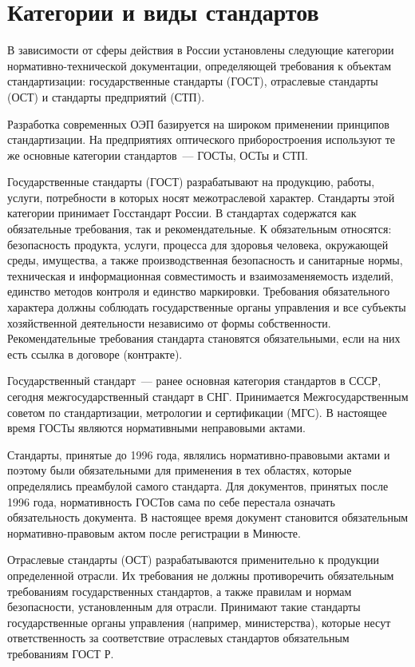 \section{Категории и виды стандартов}

В зависимости от сферы действия в России установлены следующие категории нормативно-технической документации, определяющей требования к объектам стандартизации: государственные стандарты (ГОСТ), отраслевые стандарты (ОСТ) и стандарты предприятий (СТП).

Разработка современных ОЭП базируется на широком применении принципов стандартизации. На предприятиях оптического приборостроения используют те же основные категории стандартов~--- ГОСТы, ОСТы и СТП.

Государственные стандарты (ГОСТ) разрабатывают на продукцию, работы, услуги, потребности в которых носят межотраслевой характер. Стандарты этой категории принимает Госстандарт России. В стандартах содержатся как обязательные требования, так и рекомендательные. К  обязательным относятся: безопасность продукта, услуги, процесса для здоровья человека, окружающей среды, имущества, а также производственная безопасность и санитарные нормы, техническая и информационная совместимость и взаимозаменяемость изделий, единство методов контроля и единство маркировки. Требования обязательного характера должны соблюдать государственные органы управления и все субъекты хозяйственной деятельности независимо от формы собственности. Рекомендательные требования стандарта становятся обязательными, если на них есть ссылка в договоре (контракте).

Государственный стандарт~--- ранее основная категория стандартов в СССР, сегодня межгосударственный стандарт в СНГ. Принимается Межгосударственным советом по стандартизации, метрологии и сертификации (МГС). В настоящее время ГОСТы являются нормативными неправовыми актами.

Стандарты, принятые до 1996 года, являлись нормативно-правовыми актами и поэтому были обязательными для применения в тех областях, которые определялись преамбулой самого стандарта. Для документов, принятых после 1996 года, нормативность ГОСТов сама по себе перестала означать обязательность документа. В настоящее время документ становится обязательным нормативно-правовым актом после регистрации в Минюсте.

Отраслевые стандарты (ОСТ) разрабатываются применительно к продукции определенной отрасли. Их требования не должны противоречить обязательным требованиям государственных стандартов, а также правилам и нормам безопасности, установленным для отрасли. Принимают такие стандарты государственные органы управления (например, министерства), которые несут ответственность за соответствие отраслевых стандартов обязательным требованиям ГОСТ Р.

